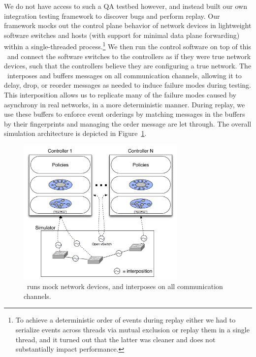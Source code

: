 We do not have access to such a QA testbed however, and instead built our own
integration testing framework to discover bugs and
perform replay. Our framework mocks out the control plane
behavior of network devices in lightweight software switches and hosts (with
support for minimal data plane forwarding)
within a single-threaded process.\footnote{To achieve a deterministic order of
events during replay either we had to serialize events across threads via
mutual exclusion or replay them in a single thread, and it turned out that
the latter was cleaner and does not substantially impact performance.} We then
run the control software on
top of this \tester~and connect the software switches to the controllers as if they were true
network devices, such that the controllers believe they are configuring a true
network. The \tester~interposes and buffers messages on all communication
channels, allowing it to delay, drop, or reorder
messages as needed to induce failure modes during testing. This interposition
allows us to replicate many of the failure modes caused by asynchrony in real
networks, in a more deterministic manner. During
replay, we use these buffers to enforce event orderings by
matching messages in the buffers by their fingerprints and managing
the order message are let through. The overall simulation architecture is depicted in
Figure~\ref{fig:architecture}.

\begin{figure}[t]
    \includegraphics[width=3.25in]{../diagrams/architecture/Debugger_Architecture.pdf}
    \caption[]{\label{fig:architecture} \projectname~runs mock
    network devices, and interposes on all communication
    channels. }
\end{figure}

